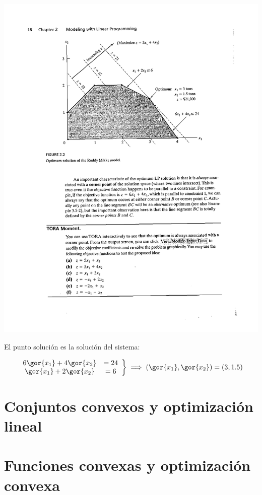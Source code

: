 \documentclass[palatino,nochap]{apuntes}
\begin{document}
\begin{example}
\begin{center}
\includegraphics[scale=0.8]{tex/berrendero/tema1/_GraficoEjemplo2}
\end{center}


El punto solución es la solución del sistema:

\[
\left.\begin{array}{cc} 6\gor{x_1} + 4\gor{x_2} &= 24\\ \gor{x_1} + 2\gor{x_2} &= 6\end{array}\right\} \implies (\gor{x_1},\gor{x_2}) = (3,1.5)
\]
\end{example}


\chapter{Conjuntos convexos y optimización lineal}



\chapter{Funciones convexas y optimización convexa}
\end{document}
